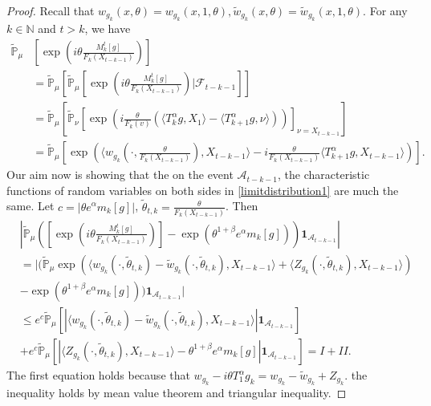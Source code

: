 \documentclass[12pt, a4paper]{amsart}
\theoremstyle{definition}
\numberwithin{equation}{section}
\begin{document}
\begin{proof}
    Recall that $w_{g_k}(x,\theta)=w_{g_k}(x,1,\theta),\tilde{w}_{g_k}(x,\theta)=\tilde{w}_{g_k}(x,1,\theta)$. For any $k\in\mathbb{N}$ and $t>k$, we have
    \begin{align*}
        \mathbb{\tilde{P}}_{\mu}&[\exp(i\theta\frac {M_k^t[g]}{F_k(X_{t-k-1})})]\\
        &=\mathbb{\tilde{P}}_{\mu}\left[\mathbb{\tilde{P}}_{\mu}[\exp(i\theta\frac{M_k^t[g]}{F_k(X_{t-k-1})})|\mathcal{F}_{t-k-1}]\right]\\
        &=\mathbb{\tilde{P}}_{\mu}\left[\mathbb{\tilde{P}}_{\nu}\left[\exp\left(i\frac{\theta}{F_k(v)}(\langle T_k^{\alpha}g,X_1\rangle-\langle T_{k+1}^{\alpha}g,\nu\rangle)\right)\right]_{\nu=X_{t-k-1}}\right]\\
        &=\mathbb{\tilde{P}}_{\mu}\left[\exp\left(\langle w_{g_k}(\cdot,\frac{\theta}{F_k(X_{t-k-1})}),X_{t-k-1}\rangle-i\frac{\theta}{F_k(X_{t-k-1})}\langle T_{k+1}^{\alpha}g, X_{t-k-1}\rangle\right)\right].
    \end{align*}
    Our aim now is showing that the on the event $\mathcal{A}_{t-k-1}$, the characteristic functions of random variables on both sides in \eqref{limitdistribution1} are much the same. Let $c=|\theta e^{\alpha}m_k[g]|$, $\tilde{\theta}_{t,k}=\frac{\theta}{F_k(X_{t-k-1})}$. Then
    \begin{align*}
        &\left|\mathbb{\tilde{P}}_{\mu}\left([\exp(i\theta \frac {M_k^t[g]}{F_k(X_{t-k-1})})]-\exp(\theta^{1+\beta}e^{\alpha}m_k[g])\right)\mathbf{1}_{\mathcal{A}_{t-k-1}}\right|\\
        &=\bigg|\big(\mathbb{\tilde{P}}_{\mu}\exp(\langle w_{g_k}(\cdot,\tilde{\theta}_{t,k})-\tilde{w}_{g_k}(\cdot, \tilde{\theta}_{t,k}),X_{t-k-1}\rangle+\langle Z_{g_k}(\cdot,\tilde{\theta}_{t,k}),X_{t-k-1}\rangle)\\
        &-\exp(\theta^{1+\beta}e^{\alpha}m_k[g])\big)\mathbf{1}_{\mathcal{A}_{t-k-1}}\bigg|\\
        &\leq e^c\mathbb{\tilde{P}}_{\mu}\left[\left|\langle w_{g_k}(\cdot,\tilde{\theta}_{t,k})-\tilde{w}_{g_k}(\cdot,\tilde{\theta}_{t,k}), X_{t-k-1}\rangle\right|\mathbf{1}_{\mathcal{A}_{t-k-1}}\right]\\
        &+e^c\mathbb{\tilde{P}}_{\mu}\left[\left|\langle Z_{g_k}(\cdot,\tilde{\theta}_{t,k}),X_{t-k-1}\rangle-\theta^{1+\beta}e^{\alpha}m_k[g]\right|\mathbf{1}_{\mathcal{A}_{t-k-1}}\right]=I+II.
    \end{align*}
    The first equation holds because that $w_{g_k}-i\theta T_1^{\alpha}g_k=w_{g_k}-\tilde{w}_{g_k}+Z_{g_k}$. the inequality holds by mean value theorem and triangular inequality.
    

\end{proof}
\end{document}
